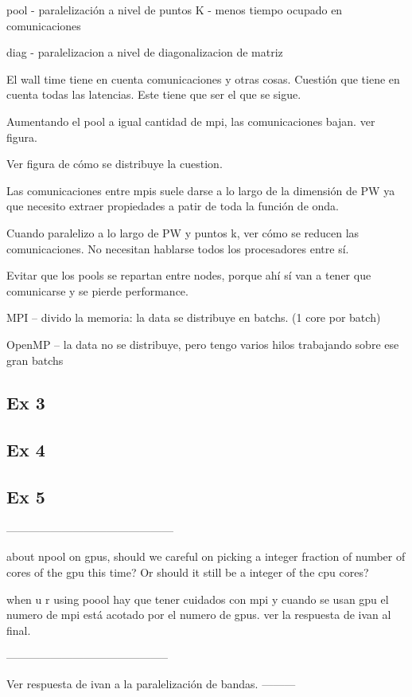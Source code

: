   pool - paralelización a nivel de puntos K - menos tiempo ocupado en comunicaciones

  diag - paralelizacion a nivel de diagonalizacion de matriz


  El wall time tiene en cuenta comunicaciones y otras cosas. Cuestión que tiene en cuenta todas las latencias. Este tiene que ser el que se sigue.


  Aumentando el pool a igual cantidad de mpi, las comunicaciones bajan. ver figura.

  Ver figura de cómo se distribuye la cuestion.

  Las comunicaciones entre mpis suele darse a lo largo de la dimensión de PW ya que necesito extraer propiedades a patir de toda la función de onda.

  Cuando paralelizo a lo largo de PW y puntos k, ver cómo se reducen las comunicaciones. No necesitan hablarse todos los procesadores entre sí.

  Evitar que los pools se repartan entre nodes, porque ahí sí van a tener que comunicarse y se pierde performance.

  MPI  -- divido la memoria: la data se distribuye en batchs. (1 core por batch)

  OpenMP -- la data no se distribuye, pero tengo varios hilos trabajando sobre ese gran batchs

\subsection{Ex 3}


\subsection{Ex 4}


\subsection{Ex 5}

---------------------------------------------

  about npool on gpus, should we careful on picking a integer fraction of number of cores of the gpu this time? Or should it still be a integer of the cpu cores?

  when u r using poool hay que tener cuidados con mpi y cuando se usan gpu el numero de mpi está acotado por el numero de gpus. ver la respuesta de ivan al final.



--------------------------------------------

  Ver respuesta de ivan a la paralelización de bandas.
---------
